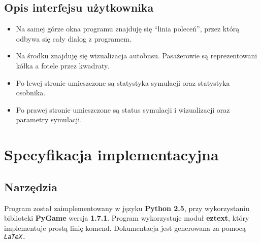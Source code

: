 \documentclass[bibtotocnumbered, headsepline,normalheadings,12pt,polish]{scrreprt}
\begin{document}
\pagebreak
\section{Opis interfejsu użytkownika}
\begin{itemize}
    \item Na samej górze okna programu znajduję się ``linia poleceń'', przez którą odbywa się cały dialog z programem.
    \item Na środku znajduję się wizualizacja autobusu. Pasażerowie są reprezentowani kółka a fotele przez kwadraty.
    \item Po lewej stronie umieszczone są statystyka symulacji oraz statystyka osobnika.
    \item Po prawej stronie umieszczone są status symulacji i wizualizacji oraz parametry symulacji.
\end{itemize}


%

\chapter{Specyfikacja implementacyjna}
\section{Narzędzia}
Program został zaimplementowany w języku \textbf{Python 2.5}, przy wykorzystaniu biblioteki \textbf{PyGame} wersja \textbf{1.7.1}. Program wykorzystuje moduł \textbf{eztext}, który implementuje prostą linię komend.
Dokumentacja jest generowana za pomocą \texttt{\textit{LaTeX}.}
\end{document}
